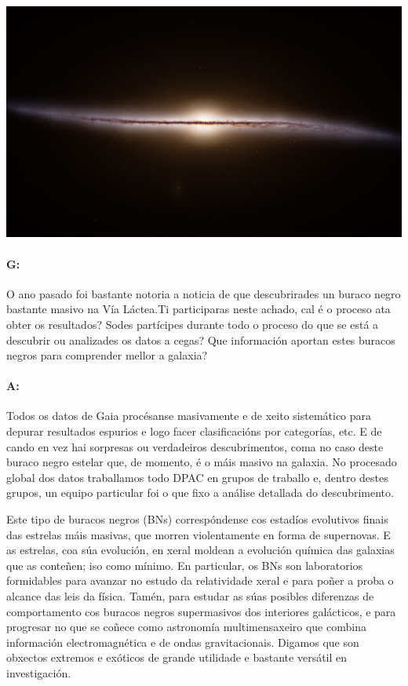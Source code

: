 \begin{refsection}
\begin{multicols}{2}
\begin{center}
    \includegraphics[width=1\linewidth]{revistas/002/imaxes/vialactea.jpg}
\end{center}

\paragraph{G:} O ano pasado foi bastante notoria a noticia de que descubrirades un
buraco negro bastante masivo na Vía Láctea.Ti participaras neste achado, cal é
o proceso ata obter os resultados? Sodes partícipes durante todo o proceso do
que se está a descubrir ou analizades os datos a cegas? Que información aportan
estes buracos negros para comprender mellor a galaxia?

\paragraph{A:} Todos os datos de Gaia procésanse masivamente e de xeito
sistemático para depurar resultados espurios e logo facer clasificacións por
categorías, etc. E de cando en vez hai sorpresas ou verdadeiros descubrimentos,
coma no caso deste buraco negro estelar que, de momento, é o máis masivo na
galaxia. No procesado global dos datos traballamos todo DPAC en grupos de
traballo e, dentro destes grupos, un equipo particular foi o que fixo a análise
detallada do descubrimento.

Este tipo de buracos negros (BNs) correspóndense cos estadíos evolutivos finais
das estrelas máis masivas, que morren violentamente en forma de supernovas. E
as estrelas, coa súa evolución, en xeral moldean a evolución química das
galaxias que as conteñen; iso como mínimo. En particular, os BNs son
laboratorios formidables para avanzar no estudo da relatividade xeral e para
poñer a proba o alcance das leis da física. Tamén, para estudar as súas
posibles diferenzas de comportamento cos buracos negros supermasivos dos
interiores galácticos, e para progresar no que se coñece como astronomía
multimensaxeiro que combina información electromagnética e de ondas
gravitacionais. Digamos que son obxectos extremos e exóticos de grande
utilidade e bastante versátil en investigación.


\end{multicols}
\end{refsection}
